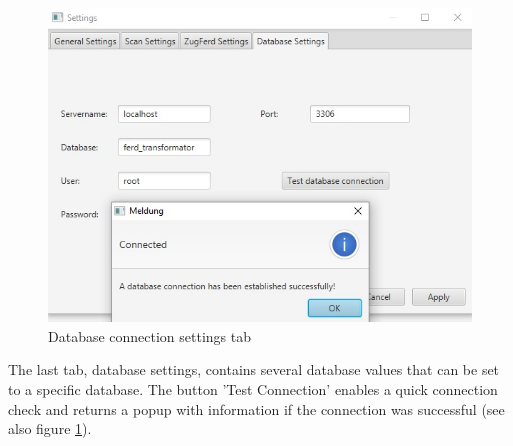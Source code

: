 \begin{figure}[ht!]
\centering
\includegraphics[width=\textwidth]{Images/GUI/settings_Database.jpg}
\caption{Database connection settings tab \label{settings_Database}}
\end{figure}

The last tab, database settings, contains several database values that can be set to a specific database. The button 'Test Connection' enables a quick connection check and returns a popup with information if the connection was successful (see also figure \ref{settings_Database}). 